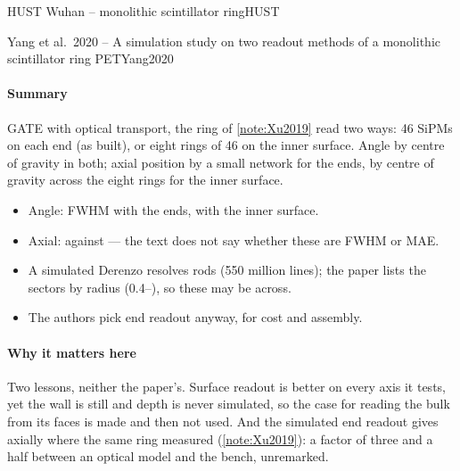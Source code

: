 \begin{programnote}{HUST Wuhan -- monolithic scintillator ring}{HUST}
\begin{papernote}{Yang et al.\ 2020 -- A simulation study on two readout methods of a monolithic scintillator ring PET}{Yang2020}
\paragraph{Summary}
GATE with optical transport, the ring of \ref{note:Xu2019} read two ways:
46 SiPMs on each end (as built), or eight rings of 46 on the inner surface.
Angle by centre of gravity in both; axial position by a small network for the
ends, by centre of gravity across the eight rings for the inner surface.
\begin{itemize}
	\item Angle:  FWHM with the ends,  with the inner surface.
	\item Axial:  against  --- the text does not say whether
		these are FWHM or MAE.
	\item A simulated Derenzo resolves  rods (550 million lines);
		the paper lists the sectors by radius (0.4--), so these may be  across.
	\item The authors pick end readout anyway, for cost and assembly.
\end{itemize}

\paragraph{Why it matters here}
Two lessons, neither the paper's. Surface readout is better on every axis it
tests, yet the wall is still  and depth is never simulated, so the case
for reading the bulk from its faces is made and then not used. And the
simulated end readout gives  axially where the same ring measured
 (\ref{note:Xu2019}): a factor of three and a half between an
optical model and the bench, unremarked.

\end{papernote}

\end{programnote}


